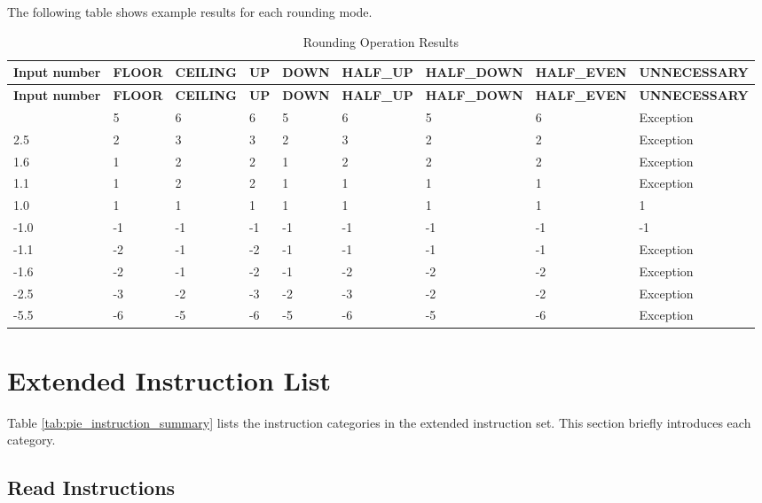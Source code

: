 \documentclass[main\_\_EN.tex]{subfiles}
\begin{document}
The following table shows example results for each rounding mode.

\begin{longtable}[c]{|l|l|l|l|l|l|l|l|l|}
    \caption{Rounding Operation Results}
    \label{tab:ESP-rounding-mode-results}\\
    \hline
    \rowcolor{lightgray}
    \textbf{Input number} & \textbf{FLOOR} & \textbf{CEILING} & \textbf{UP} & \textbf{DOWN}  & \textbf{HALF\_UP} & \textbf{HALF\_DOWN} & \textbf{HALF\_EVEN} & \textbf{UNNECESSARY}\\\hline
    \endfirsthead
    \rowcolor{lightgray}
        \textbf{Input number} & \textbf{FLOOR} & \textbf{CEILING} & \textbf{UP} & \textbf{DOWN}  & \textbf{HALF\_UP} & \textbf{HALF\_DOWN} & \textbf{HALF\_EVEN} & \textbf{UNNECESSARY} \\\hline
    \endhead
    \endfoot
 5.5 & 5 & 6& 6 &5 & 6 & 5 & 6 & Exception \\\hline
 2.5 & 2 & 3& 3& 2& 3& 2& 2& Exception \\\hline
 1.6 & 1 & 2& 2& 1& 2& 2& 2& Exception \\\hline
 1.1 & 1 & 2& 2& 1& 1& 1& 1& Exception \\\hline
 1.0 & 1 & 1& 1& 1& 1& 1& 1& 1 \\\hline
 -1.0 & -1 & -1 & -1 & -1 & -1 & -1 & -1 & -1 \\\hline
 -1.1 & -2 & -1 & -2 & -1 & -1 & -1 & -1 & Exception \\\hline
 -1.6 & -2 & -1 &-2 & -1 & -2 & -2& -2& Exception \\\hline
 -2.5 & -3 & -2 & -3 & -2 & -3 & -2 & -2 & Exception \\\hline
 -5.5 & -6 & -5 & -6 & -5 & -6 & -5 & -6 & Exception \\\hline
    \end{longtable}

\section{Extended Instruction List}\label{sec:pie-instruction-simple-introduction}

Table \ref{tab:pie_instruction_summary} lists the instruction categories in the extended instruction set. This section briefly introduces each category.

\newpage


\subsection{Read Instructions}
\label{sec:pie-load-instructions}
\end{document}
